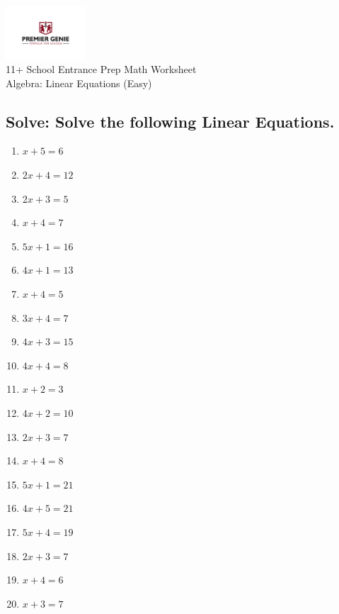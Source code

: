 \documentclass{article}
\begin{document}
\begin{center}
\includegraphics[width=3cm]{PREMGENIEJPG.jpg}\\
{\Large 11+ School Entrance Prep Math Worksheet}\\
{\Medium Algebra: Linear Equations (Easy)}\\

\end{center}

\subsection*{Solve: Solve the following Linear Equations.}

\begin{enumerate}
\item $\displaystyle x + 5=6 $ \ 
\item $\displaystyle 2 x + 4=12 $ \ 
\item $\displaystyle 2 x + 3=5 $ \ 
\item $\displaystyle x + 4=7 $ \ 
\item $\displaystyle 5 x + 1=16 $ \ 
\item $\displaystyle 4 x + 1=13 $ \ 
\item $\displaystyle x + 4=5 $ \ 
\item $\displaystyle 3 x + 4=7 $ \ 
\item $\displaystyle 4 x + 3=15 $ \ 
\item $\displaystyle 4 x + 4=8 $ \ 
\item $\displaystyle x + 2=3 $ \ 
\item $\displaystyle 4 x + 2=10 $ \ 
\item $\displaystyle 2 x + 3=7 $ \ 
\item $\displaystyle x + 4=8 $ \ 
\item $\displaystyle 5 x + 1=21 $ \ 
\item $\displaystyle 4 x + 5=21 $ \ 
\item $\displaystyle 5 x + 4=19 $ \ 
\item $\displaystyle 2 x + 3=7 $ \ 
\item $\displaystyle x + 4=6 $ \ 
\item $\displaystyle x + 3=7 $ \ 


\end{enumerate}
\end{document}
